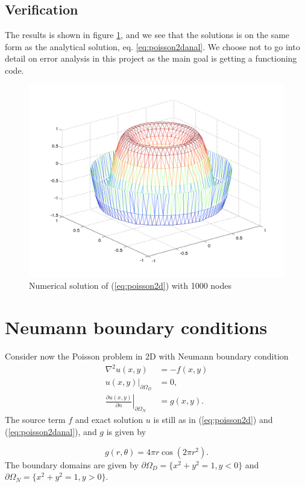 \documentclass[paper=a4, fontsize=11pt]{scrartcl} %
\begin{document}
\subsection{Verification}
The results is shown in figure \ref{fig:2h1000}, and we see that the solutions is on the same form as the analytical solution, eq.  \eqref{eq:poisson2danal}. We choose not to go into detail on error analysis in this project as the main goal is getting a functioning code.
\begin{figure}[!htb]
\center
  \includegraphics[width=0.6\linewidth]{2h1000.png}
  \caption{Numerical solution of (\ref{eq:poisson2d}) with 1000 nodes}\label{fig:2h1000}
\end{figure}


\section{Neumann boundary conditions}
Consider now the Poisson problem in 2D with Neumann boundary condition
\begin{equation}
\begin{aligned}
\nabla^2u(x,y) 	&= -f(x,y) \\
\left. u(x,y)\right|_{\partial\Omega_D} 	&= 0, \\
\left. \frac{\partial u(x,y)}{\partial n}\right|_{\partial\Omega_N} &= g(x,y).
\end{aligned}
\label{eq:poisson2d:Neu:problem}
\end{equation}
The source term $f$ and exact solution $u$ is still as in (\ref{eq:poisson2d}) and (\ref{eq:poisson2danal}), and $g$ is given by

\begin{equation}
g(r,\theta) =4\pi r\cos(2\pi r^2).
\label{eq:poisson2d:Neu:condition}
\end{equation}
The boundary domains are given by $\partial\Omega_D = \{x^2+y^2=1,y<0\}$ and $\partial\Omega_N = \{x^2+y^2=1,y>0\}$.
\end{document}
